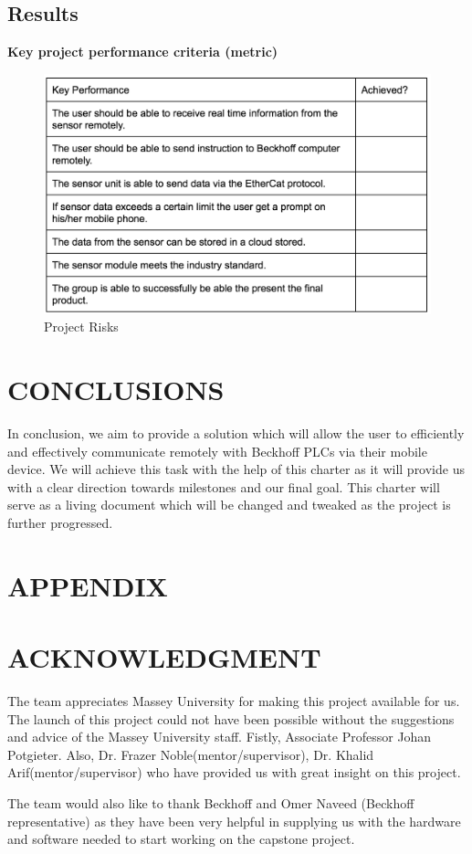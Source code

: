 \documentclass[a4paper, 10pt, conference]{IEEEconf}
\begin{document}
\subsection{Results}
{\bf Key project performance criteria (metric)}

\begin{figure}[h!]
  \includegraphics[width=\linewidth]{images/Preformance}
  \caption{Project Risks}
  \label{fig:ProjectRisks}
\end{figure}


\section{CONCLUSIONS}
In conclusion, we aim to provide a solution which will allow the user to efficiently and effectively communicate remotely with Beckhoff PLCs via their mobile device. We will achieve this task with the help of this charter as it will provide us with a clear direction towards milestones and our final goal. This charter will serve as a living document which will be changed and tweaked as the project is further progressed.

\addtolength{\textheight}{-12cm}   %


\section*{APPENDIX}


\section*{ACKNOWLEDGMENT}
The team appreciates Massey University for making this project available for us. The launch of this project could not have been possible without the suggestions and advice of the Massey University staff. Fistly, Associate Professor Johan Potgieter. Also, Dr. Frazer Noble(mentor/supervisor), Dr. Khalid Arif(mentor/supervisor) who have provided us with great insight on this project. 

The team would also like to thank Beckhoff and Omer Naveed (Beckhoff representative) as they have been very helpful in supplying us with the hardware and software needed to start working on the capstone project. 


\nocite{*}
\nocite{key}


\end{document}
